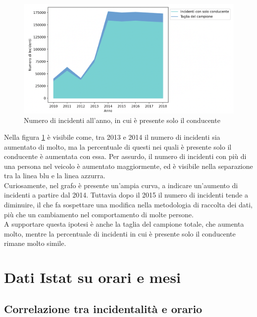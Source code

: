 \documentclass[a4paper]{report}
\begin{document}
\begin{figure}
    \includegraphics[width=\linewidth]{../src/incidenti/incidenti_senza_coords/anno/incremento_incidenti.png}
    \caption{Numero di incidenti all'anno, in cui è presente solo il conducente}
    \label{fig:incremento-incidenti}
\end{figure}

Nella figura \ref{fig:incremento-incidenti} è visibile come, 
tra 2013 e 2014 il numero di incidenti sia aumentato di molto, 
ma la percentuale di questi nei quali è presente solo il conducente è aumentata con essa.
Per assurdo, il numero di incidenti con più di una persona nel veicolo è aumentato maggiormente, 
ed è visibile nella separazione tra la linea blu e la linea azzurra.\\

Curiosamente, nel grafo è presente un'ampia curva, a indicare un'aumento di incidenti 
a partire dal 2014. Tuttavia dopo il 2015 il numero di incidenti tende a diminuire, il che 
fa sospettare una modifica nella metodologia di raccolta dei dati, più che un cambiamento 
nel comportamento di molte persone.\\
A supportare questa ipotesi è anche la taglia del campione totale, che aumenta molto, mentre la 
percentuale di incidenti in cui è presente solo il conducente rimane molto simile.


\section{Dati Istat su orari e mesi}

\subsection{Correlazione tra incidentalità e orario}
\end{document}
